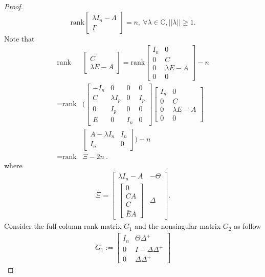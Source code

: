 \documentclass[english]{cccconf}
\theoremstyle{definition}
\begin{document}
\begin{proof}
\begin{equation}
\textrm{rank}\begin{bmatrix}
\lambda I_n-\Lambda\\\Gamma
\end{bmatrix}=n,\ \forall\lambda\in\mathbb{C}, ||\lambda||\geq1.
\end{equation}
Note that
\begin{align}
\textrm{rank}&\begin{bmatrix}
C\\\lambda E-A
\end{bmatrix}=\textrm{rank}\begin{bmatrix}
I_n&0\\0&C\\0&\lambda E-A\\0&0
\end{bmatrix}-n\nonumber\\
=\textrm{rank}&\Bigg(\begin{bmatrix}
-I_n&0&0&0\\C&\lambda I_p&0&I_p\\0&I_p&0&0\\E&0&I_n&0
\end{bmatrix}\begin{bmatrix}
I_n&0\\0&C\\0&\lambda E-A\\0&0
\end{bmatrix}\nonumber\\ &\begin{bmatrix}
A-\lambda I_n&I_n\\I_n&0
\end{bmatrix}\Bigg)-n\\
=\textrm{rank}&\Xi-2n\ .\nonumber
\end{align}
where
\begin{align*}
\Xi=\begin{bmatrix}
\lambda I_n-A&-\Theta\\\begin{bmatrix}
0\\CA\\C\\\bar{E}A
\end{bmatrix}&\Delta
\end{bmatrix}.
\end{align*}
Consider the full column rank matrix $G_1$ and the nonsingular matrix $G_2$  as follow
\begin{align*}
G_1:=\begin{bmatrix}
I_n&\Theta\Delta^+\\0&I-\Delta\Delta^+\\0&\Delta\Delta^+

\end{bmatrix}
\end{align*}
\end{proof}
\end{document}
